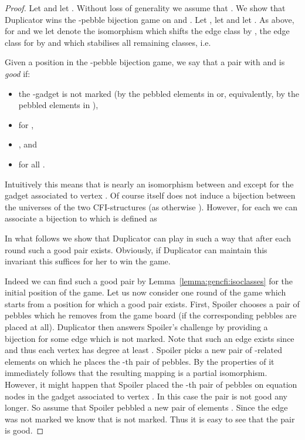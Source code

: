 \documentclass[a4paper,UKenglish]{lipics}
\theoremstyle{plain}
\begin{document}
\begin{proof}
 Let  and let . 
 Without loss of generality we assume that .
 We show 
that Duplicator wins the -pebble bijection game 
on  and . Let , let  and let .
As above, for  and  we let  denote the isomorphism which shifts the edge class  by 
, the edge class  for  by  and which stabilises all 
remaining classes, i.e.\

Given a position  in the 
-pebble bijection game, we say that a pair  with  and  is \emph{good} if:
\begin{itemize}
 \item the -gadget is not marked (by the pebbled elements  in  or, equivalently, by the pebbled elements  in ),
 \item  for , 
 \item , and
 \item  for all .
\end{itemize}
Intuitively this means that  is nearly an isomorphism between  
and  except for the gadget associated to vertex .
Of course  itself does not induce a bijection between the universes 
of the two CFI-structures (as otherwise ).
However, for each  we can associate a bijection  to  which is defined as


In what follows we show that Duplicator can play in such a way that 
after each round such a good pair  exists. Obviously, if Duplicator 
can 
maintain this invariant this suffices for her to win the game.

Indeed we can find such a good pair  
by Lemma~\ref{lemma:gencfi:isoclasses} for the initial position  
of the game.
Let us now consider one round of the game which starts from a 
position  for which a 
good 
pair  exists.
First, Spoiler chooses a pair  of pebbles which he removes from the 
game board (if the corresponding pebbles are placed at all). 
Duplicator then answers Spoiler's challenge by providing a bijection 
 for some edge  which is not marked. 
Note that such an edge  exists since  and thus each 
vertex has degree at least .
Spoiler picks a new pair  of -related elements on which he places the -th pair of pebbles.
By the properties of  it immediately follows that the resulting mapping 
 is a partial isomorphism. 
However, it might happen that Spoiler placed the -th pair of pebbles on 
equation nodes  in the gadget associated to vertex . In this case 
the 
pair  is not good any longer.
So assume that Spoiler pebbled a new pair of elements .
Since the edge  was not marked we know that  is not 
marked.
Thus it is easy to see that the 
pair  is good. 
\end{proof}
\end{document}
